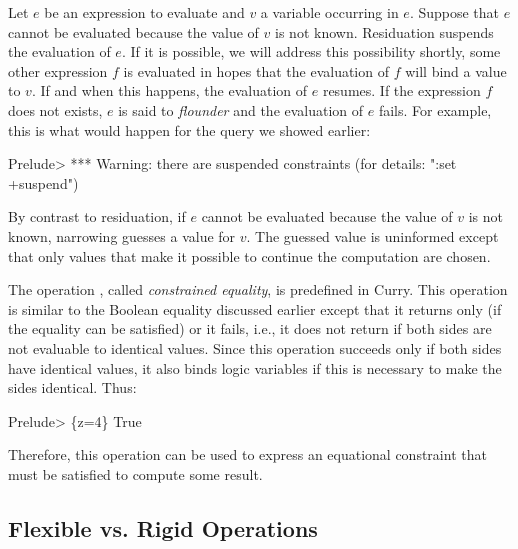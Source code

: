 Let $e$ be an expression to evaluate and $v$ a variable
occurring in $e$.
Suppose that $e$ cannot be evaluated because the value of
$v$ is not known.
Residuation suspends the evaluation of $e$.
If it is possible, we will address this possibility shortly,
some other expression $f$ is evaluated in hopes that the evaluation
of $f$ will bind a value to $v$.  If and when this happens,
the evaluation of $e$ resumes.
If the expression $f$ does not exists, $e$ is said to
\emph{flounder} and the evaluation of $e$
fails.
For example, this is what would happen for the query we showed
earlier:
%
\begin{prog}
Prelude> 
*** Warning: there are suspended constraints (for details: ":set +suspend")
\end{prog}
%
By contrast to residuation, 
if $e$ cannot be evaluated because the value of $v$ is not known,
narrowing guesses a value for $v$.
The guessed value is uninformed except that only values that
make it possible to continue the computation are chosen.

The operation \ccode{=:=},
called \emph{constrained equality},
is predefined in Curry.
This operation is similar to the Boolean equality
discussed earlier except that it returns only 
(if the equality can be satisfied) or it fails,
i.e., it does not return  if both sides are not evaluable
to identical values.
Since this operation succeeds only if both sides have identical values,
it also binds logic variables if this is necessary to make the sides
identical.
Thus:
%
\begin{prog}
Prelude> 
\{z=4\} True
\end{prog}
%
Therefore, this operation can be used to express an
equational constraint that must be satisfied to compute some result.

\subsection{Flexible vs. Rigid Operations}

